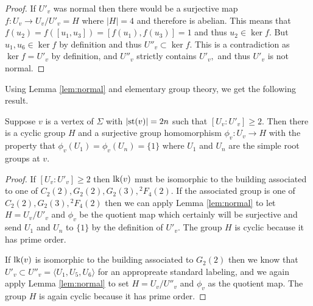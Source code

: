 \documentclass[class=book, crop=false,12 pt]{standalone}
\begin{document}
\begin{proof}
	If $U'_v$ was normal then there would be a surjective map $f:U_v\to U_v/U'_v=H$ where $|H|=4$ and therefore is abelian. This means that $f(u_2)=f([u_1,u_3])=[f(u_1),f(u_3)]=1$ and thus $u_2\in \ker f.$ But $u_1,u_6\in \ker f$ by definition and thus $U''_v\subset \ker f.$ This is a contradiction as $\ker f=U'_v$ by definition, and $U''_v$ strictly contains $U'_v,$ and thus $U'_v$ is not normal.

\end{proof}

Using Lemma \ref{lem:normal} and elementary group theory, we get the following result.
\begin{cor}
	\label{cor:phiv}
	Suppose $v$ is a vertex of $\Sigma$ with $|\mathrm{st}(v)|=2n$ such that $[U_v:U'_v]\ge 2.$ Then there is a cyclic group $H$ and a surjective group homomorphism $\phi_v:U_v\to H$ with the property that $\phi_v(U_1)=\phi_v(U_n)=\{1\}$ where $U_1$ and $U_n$ are the simple root groups at $v.$
\end{cor}
\begin{proof}
	If $[U_v:U'_v]\ge 2$ then $\mathrm{lk}(v)$ must be isomorphic to the building associated to one of $C_2(2),G_2(2),G_2(3),{}^2F_4(2).$ If the associated group is one of $C_2(2),G_2(3),{}^2F_4(2)$ then we can apply Lemma \ref{lem:normal} to let $H=U_v/U'_v$ and $\phi_v$ be the quotient map which certainly will be surjective and send $U_1$ and $U_n$ to $\{1\}$ by the definition of $U'_v.$ The group $H$ is cyclic because it has prime order.

	If $\mathrm{lk}(v)$ is isomorphic to the building associated to $G_2(2)$ then we know that $U'_v\subset U''_v=\langle U_1,U_5,U_6\rangle$ for an appropreate standard labeling, and we again apply Lemma \ref{lem:normal} to set $H=U_v/U''_v$ and $\phi_v$ as the quotient map. The group $H$ is again cyclic because it has prime order.
\end{proof}
\end{document}
